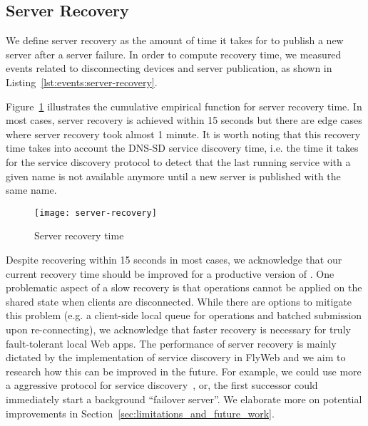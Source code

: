 \subsection{Server Recovery}
\label{sub:eval:server-recovery}

We define server recovery as the amount of time it takes for \APIName to publish a new server after a server failure.
In order to compute recovery time, we measured events related to disconnecting devices and server publication, as shown
in Listing~\ref{lst:events:server-recovery}. 


Figure~\ref{fig:server-recovery} illustrates the cumulative empirical function for server recovery time.
In most cases, server recovery is achieved within 15 seconds but there are edge cases where server recovery took almost 1 minute. 
It is worth noting that this recovery time takes into account the DNS-SD service discovery time, i.e. the time it takes for the service discovery protocol to detect that the last running service with a given name is not available anymore until a new server is published with the same name. 



\begin{figure}
    \centering
    \texttt{[image: server-recovery]}
    \caption{Server recovery time}
    \label{fig:server-recovery}
\end{figure}


Despite recovering within 15 seconds in most cases, we acknowledge that our current recovery time should be improved for a productive version of \APINameNoSpace. 
One problematic aspect of a slow recovery is that operations cannot be applied on the shared state when clients are disconnected. 
While there are options to mitigate this problem (e.g. a client-side local queue for operations and batched submission upon re-connecting), we acknowledge that faster recovery is necessary for truly fault-tolerant local Web apps.
The performance of server recovery is mainly dictated by the implementation of service discovery in FlyWeb and we aim to research how this can be improved in the future.
For example, we could use more a aggressive protocol for service discovery~\cite{hong2007accelerating}, or, the first successor could immediately start a background ``failover server''.  
We elaborate more on potential improvements in Section~\ref{sec:limitations_and_future_work}.